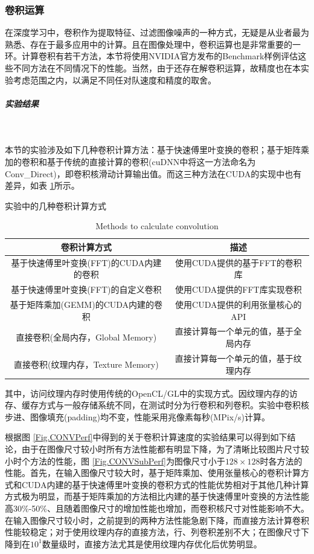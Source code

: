 \subsubsection{卷积运算}
\par 在深度学习中，卷积作为提取特征、过滤图像噪声的一种方式，无疑是从业者最为熟悉、存在于最多应用中的计算。且在图像处理中，卷积运算也是非常重要的一环。计算卷积有若干方法，本节将使用NVIDIA官方发布的Benchmark样例评估这些不同方法在不同情况下的性能。当然，由于还存在解卷积运算，故精度也在本实验考虑范围之内，以满足不同任对队速度和精度的取舍。
\subparagraph{实验结果}~{}
\par 本节的实验涉及如下几种卷积计算方法：基于快速傅里叶变换的卷积；基于矩阵乘加的卷积和基于传统的直接计算的卷积(cuDNN中将这一方法命名为Conv\_Direct)，即卷积核滑动计算输出值。而这三种方法在CUDA的实现中也有差异，如表 \ref{table-CONV}所示。
\begin{table}
	\centering
	\renewcommand{\thetable}{\arabic{section}-\arabic{table} }
	\renewcommand{\tablename}{表}
	\caption{实验中的几种卷积计算方式}
	\addtocounter{table}{-1}
	\renewcommand{\thetable}{\arabic{section}-\arabic{table} }
	\renewcommand{\tablename}{Table}
	\caption{Methods to calculate convolution}
	\begin{tabular}{cc}
		\toprule
		卷积计算方式	&	描述\\
		\midrule
		基于快速傅里叶变换(FFT)的CUDA内建的卷积 & 使用CUDA提供的基于FFT的卷积库\\
		基于快速傅里叶变换(FFT)的自定义卷积 & 使用CUDA提供的FFT库实现卷积\\
		基于矩阵乘加(GEMM)的CUDA内建的卷积 & 使用CUDA提供的利用张量核心的API\\
		直接卷积(全局内存，Global Memory) & 直接计算每一个单元的值，基于全局内存\\
		直接卷积(纹理内存，Texture Memory) & 直接计算每一个单元的值，基于纹理内存\\
		\bottomrule
	\end{tabular} \label{table-CONV} 
\end{table}
\par 其中，访问纹理内存时使用传统的OpenCL/GL中的实现方式。因纹理内存的访存、缓存方式与一般存储系统不同，在测试时分为行卷积和列卷积。实验中卷积核步进、图像填充(padding)均不变，性能采用兆像素每秒(MPix/s)计算。
\par 根据图 \ref{Fig.CONVPerf}中得到的关于卷积计算速度的实验结果可以得到如下结论，由于在图像尺寸较小时所有方法性能都有明显下降，为了清晰比较图片尺寸较小时个方法的性能，图 \ref{Fig.CONVSubPerf}为图像尺寸小于$ 128\times 128 $时各方法的性能。首先，在输入图像尺寸较大时，基于矩阵乘加、使用张量核心的卷积计算方式和CUDA内建的基于快速傅里叶变换的卷积方式的性能优势相对于其他几种计算方式极为明显，而基于矩阵乘加的方法相比内建的基于快速傅里叶变换的方法性能高30\%-50\%、且随着图像尺寸的增加性能也增加，而卷积核尺寸对性能影响不大。在输入图像尺寸较小时，之前提到的两种方法性能急剧下降，而直接方法计算卷积性能较稳定；对于使用纹理内存的直接方法，行、列卷积差别不大；在图像尺寸下降到在$ 10^1 $数量级时，直接方法尤其是使用纹理内存优化后优势明显。
